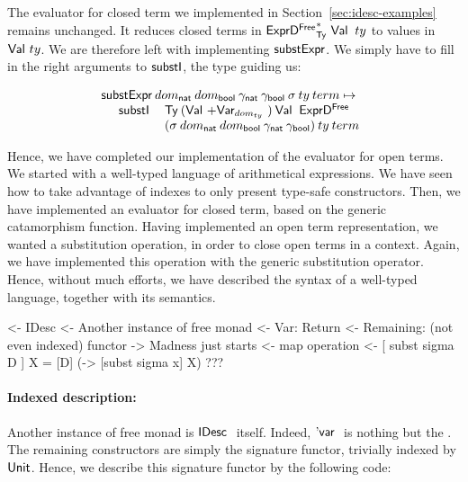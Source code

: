 The evaluator for closed term we implemented in
Section~\ref{sec:idesc-examples} remains unchanged. It reduces closed
terms in $\FreeIMonad{\HExprFreeD}{\Ty}{\Val{}}\: ty$ to values in
$\Val{ty}$. We are therefore left with implementing $\substH$. We
simply have to fill in the right arguments to $\substI$, the type
guiding us:


\[\stk{
\substH\: \domNat\: \domBool\: 
            \gammaNat\: \gammaBool\:
            \sigma\: 
            ty\: 
            term \mapsto  \\
\;\;\ \begin{array}{ll}
       \substI\: & \Ty\: 
                  (\SUM{\Val{}}{\Var{dom_{ty}}{}})\: 
                  \Val{}\:
                  \HExprFreeD\:  \\
                &
                  (\sigma\: \domNat\: \domBool\: \gammaNat\: \gammaBool)\:
                  ty\:
                  term
      \end{array}
}\]


Hence, we have completed our implementation of the evaluator for open
terms. We started with a well-typed language of arithmetical
expressions. We have seen how to take advantage of indexes to only
present type-safe constructors. Then, we have implemented an evaluator
for closed term, based on the generic catamorphism function. Having
implemented an open term representation, we wanted a substitution
operation, in order to close open terms in a context. Again, we have
implemented this operation with the generic substitution
operator. Hence, without much efforts, we have described the syntax of
a well-typed language, together with its semantics.

\begin{wstructure}
<- IDesc
    <- Another instance of free monad
        <- Var: Return
        <- Remaining: (not even indexed) functor
    -> Madness just starts
        <- map operation
        <- [ subst sigma D ] X = [D] (\x -> [subst sigma x] X)
        ???
\end{wstructure}

\paragraph{Indexed description:}

Another instance of free monad is $\IDesc$ itself. Indeed, $\DVar$ is
nothing but the \return. The remaining constructors are simply the
signature functor, trivially indexed by $\Unit$. Hence, we describe
this signature functor by the following code:

